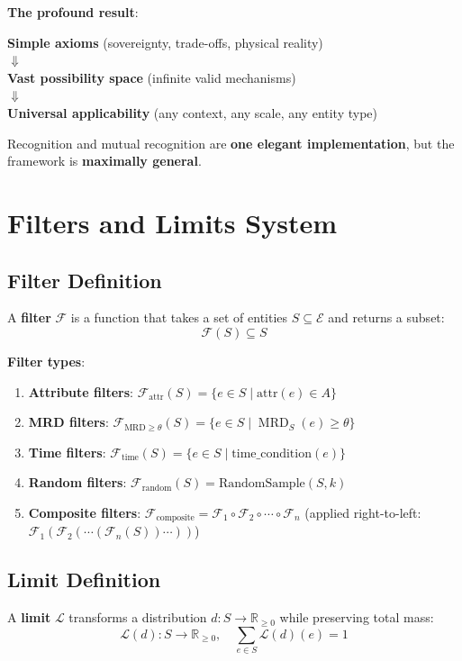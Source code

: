 \documentclass[11pt,a4paper]{article}
\theoremstyle{definition}
\theoremstyle{remark}
\newcommand{\E}{\mathcal{E}}
\newcommand{\F}{\mathcal{F}}
\DeclareMathOperator{\MRD}{MRD}
\begin{document}
\textbf{The profound result}: 
\begin{center}
\textbf{Simple axioms} (sovereignty, trade-offs, physical reality) \\
$\Downarrow$ \\
\textbf{Vast possibility space} (infinite valid mechanisms) \\
$\Downarrow$ \\
\textbf{Universal applicability} (any context, any scale, any entity type)
\end{center}

Recognition and mutual recognition are \textbf{one elegant implementation}, but the framework is \textbf{maximally general}.

\section{Filters and Limits System}
\label{sec:filters}

\subsection{Filter Definition}

A \textbf{filter} $\F$ is a function that takes a set of entities $S \subseteq \E$ and returns a subset:
\[ \F(S) \subseteq S \]

\textbf{Filter types}:
\begin{enumerate}
\item \textbf{Attribute filters}: $\F_{\text{attr}}(S) = \{ e \in S \mid \text{attr}(e) \in A \}$
\item \textbf{MRD filters}: $\F_{\text{MRD} \ge \theta}(S) = \{ e \in S \mid \MRD_S(e) \ge \theta \}$
\item \textbf{Time filters}: $\F_{\text{time}}(S) = \{ e \in S \mid \text{time\_condition}(e) \}$
\item \textbf{Random filters}: $\F_{\text{random}}(S) = \text{RandomSample}(S, k)$
\item \textbf{Composite filters}: $\F_{\text{composite}} = \F_1 \circ \F_2 \circ \cdots \circ \F_n$ (applied right-to-left: $\F_1(\F_2(\cdots(\F_n(S))\cdots))$)
\end{enumerate}

\subsection{Limit Definition}

A \textbf{limit} $\mathcal{L}$ transforms a distribution $d: S \rightarrow \mathbb{R}_{\ge 0}$ while preserving total mass:
\[ \mathcal{L}(d): S \rightarrow \mathbb{R}_{\ge 0}, \quad \sum_{e \in S} \mathcal{L}(d)(e) = 1 \]
\end{document}
